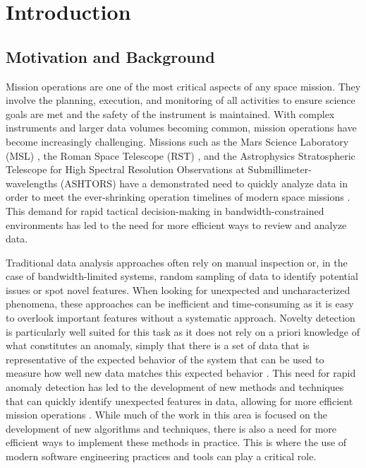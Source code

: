\chapter{Introduction}
\label{chap:introduction}
\section{Motivation and Background}
Mission operations are one of the most critical aspects of any space mission.
They involve the planning, execution, and monitoring of all activities to ensure science goals are met and the safety of the instrument is maintained.
With complex instruments and larger data volumes becoming common, mission operations have become increasingly challenging.
Missions such as the Mars Science Laboratory (MSL) \parencite{horton2021integrating}, the Roman Space Telescope (RST) \parencite{horton2024anomaly}, and the Astrophysics Stratospheric Telescope for High Spectral Resolution Observations at Submillimeter-wavelengths (ASHTORS) \parencite{horton2024board} have a demonstrated need to quickly analyze data in order to meet the ever-shrinking operation timelines of modern space missions \parencite{wilson2017nasa}.
This demand for rapid tactical decision-making in bandwidth-constrained environments has led to the need for more efficient ways to review and analyze data.

Traditional data analysis approaches often rely on manual inspection or, in the case of bandwidth-limited systems, random sampling of data to identify potential issues or spot novel features.
When looking for unexpected and uncharacterized phenomena, these approaches can be inefficient and time-consuming as it is easy to overlook important features without a systematic approach.
Novelty detection is particularly well suited for this task as it does not rely on a priori knowledge of what constitutes an anomaly, simply that there is a set of data that is representative of the expected behavior of the system that can be used to measure how well new data matches this expected behavior \parencite{japkowicz1995novelty}.
This need for rapid anomaly detection has led to the development of new methods and techniques that can quickly identify unexpected features in data, allowing for more efficient mission operations \parencite{kerner2020comparison}.
While much of the work in this area is focused on the development of new algorithms and techniques, there is also a need for more efficient ways to implement these methods in practice.
This is where the use of modern software engineering practices and tools can play a critical role.

